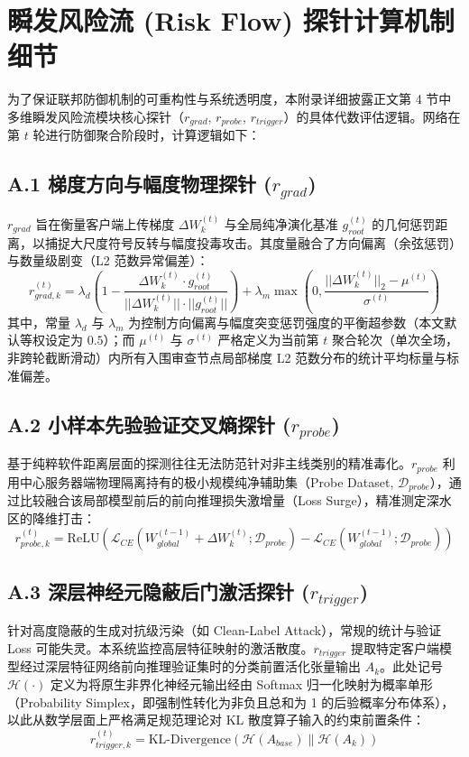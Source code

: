 \documentclass[runningheads]{llncs}
\begin{document}
\appendix
\section{瞬发风险流 (Risk Flow) 探针计算机制细节}
为了保证联邦防御机制的可重构性与系统透明度，本附录详细披露正文第 4 节中多维瞬发风险流模块核心探针（$r_{grad}$, $r_{probe}$, $r_{trigger}$）的具体代数评估逻辑。网络在第 $t$ 轮进行防御聚合阶段时，计算逻辑如下：

\subsection{A.1 梯度方向与幅度物理探针 ($r_{grad}$)}
$r_{grad}$ 旨在衡量客户端上传梯度 $\Delta W_k^{(t)}$ 与全局纯净演化基准 $g_{root}^{(t)}$ 的几何惩罚距离，以捕捉大尺度符号反转与幅度投毒攻击。其度量融合了方向偏离（余弦惩罚）与数量级剧变（L2 范数异常偏差）：
\begin{equation}
    r_{grad, k}^{(t)} = \lambda_{d} \left(1 - \frac{\Delta W_k^{(t)} \cdot g_{root}^{(t)}}{||\Delta W_k^{(t)}|| \cdot ||g_{root}^{(t)}||}\right) + \lambda_{m} \max\left(0, \frac{||\Delta W_k^{(t)}||_2 - \mu^{(t)}}{\sigma^{(t)}}\right)
\end{equation}
其中，常量 $\lambda_d$ 与 $\lambda_m$ 为控制方向偏离与幅度突变惩罚强度的平衡超参数（本文默认等权设定为 $0.5$）；而 $\mu^{(t)}$ 与 $\sigma^{(t)}$ 严格定义为当前第 $t$ 聚合轮次（单次全场，非跨轮截断滑动）内所有入围审查节点局部梯度 L2 范数分布的统计平均标量与标准偏差。

\subsection{A.2 小样本先验验证交叉熵探针 ($r_{probe}$)}
基于纯粹软件距离层面的探测往往无法防范针对非主线类别的精准毒化。$r_{probe}$ 利用中心服务器端物理隔离持有的极小规模纯净辅助集（Probe Dataset, $\mathcal{D}_{probe}$），通过比较融合该局部模型前后的前向推理损失激增量（Loss Surge），精准测定深水区的降维打击：
\begin{equation}
    r_{probe, k}^{(t)} = \text{ReLU}\left( \mathcal{L}_{CE}(W_{global}^{(t-1)} + \Delta W_k^{(t)}; \mathcal{D}_{probe}) - \mathcal{L}_{CE}(W_{global}^{(t-1)}; \mathcal{D}_{probe}) \right)
\end{equation}

\subsection{A.3 深层神经元隐蔽后门激活探针 ($r_{trigger}$)}
针对高度隐蔽的生成对抗级污染（如 Clean-Label Attack），常规的统计与验证 Loss 可能失灵。本系统监控高层特征映射的激活散度。$r_{trigger}$ 提取特定客户端模型经过深层特征网络前向推理验证集时的分类前置活化张量输出 $A_k$。此处记号 $\mathcal{H}(\cdot)$ 定义为将原生非界化神经元输出经由 Softmax 归一化映射为概率单形（Probability Simplex，即强制性转化为非负且总和为 1 的后验概率分布体系），以此从数学层面上严格满足规范理论对 KL 散度算子输入的约束前置条件：
\begin{equation}
    r_{trigger, k}^{(t)} = \text{KL-Divergence}\left( \mathcal{H}(A_{base}) \| \mathcal{H}(A_k) \right)
\end{equation}
\end{document}

